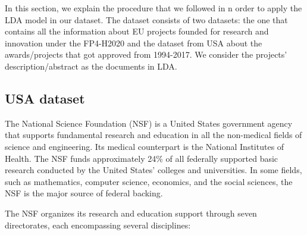 \documentclass[12pt]{report}
\begin{document}
In this section, we explain the procedure that we followed in n order to apply the LDA model in our dataset. The dataset consists of two datasets: the one that contains all the information about EU projects founded for research and innovation under the FP4-H2020 and the dataset from USA about the awards/projects that got approved from 1994-2017. We consider the projects' description/abstract as the documents in LDA.
 

\subsection{USA dataset}

The National Science Foundation (NSF) is a United States government agency that supports fundamental research and education in all the non-medical fields of science and engineering. Its medical counterpart is the National Institutes of Health. The NSF funds approximately 24\% of all federally supported basic research conducted by the United States' colleges and universities. In some fields, such as mathematics, computer science, economics, and the social sciences, the NSF is the major source of federal backing.
 
The NSF organizes its research and education support through seven directorates, each encompassing several disciplines:
\end{document}
